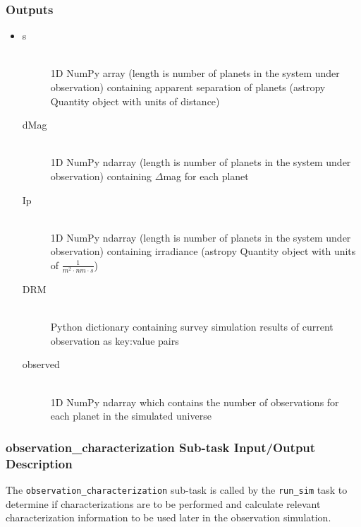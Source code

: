 \documentclass[cleanfoot]{asme2ej}
\begin{document}
\subsubsection*{Outputs}
\begin{itemize}
    \item 
    \begin{description}
        \item[s] \hfill \\
        1D NumPy array (length is number of planets in the system under observation) containing apparent separation of planets (astropy Quantity object with units of distance)
        \item[dMag] \hfill \\
        1D NumPy ndarray (length is number of planets in the system under observation) containing $ \Delta $mag for each planet
        \item[Ip] \hfill \\
        1D NumPy ndarray (length is number of planets in the system under observation) containing irradiance (astropy Quantity object with units of $ \frac{1}{m^2 \cdot nm \cdot s} $)
        \item[DRM] \hfill \\
        Python dictionary containing survey simulation results of current observation as key:value pairs
        \item[observed] \hfill \\
        1D NumPy ndarray which contains the number of observations for each planet in the simulated universe
    \end{description}
\end{itemize}

\subsubsection{observation\_characterization Sub-task Input/Output Description} \label{sec:observationcharacterizationtask}
The \verb+observation_characterization+ sub-task is called by the \verb+run_sim+ task to determine if characterizations are to be performed and calculate relevant characterization information to be used later in the observation simulation.
\end{document}

